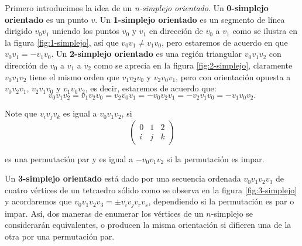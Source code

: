 \documentclass[12pt]{book}
\theoremstyle{definition}
\newcounter{in}
\begin{document}
Primero introducimos la idea de un \emph{n-simplejo orientado}. Un
\textbf{0-simplejo orientado} es un punto $v$. Un \textbf{1-simplejo
  orientado} es un segmento de línea dirigido $v_{0}v_{1}$ uniendo los
puntos $v_{0}$ y $v_{1}$ en dirección de $v_{0}$ a $v_{1}$ como se
ilustra en la figura \ref{fig:1-simplejo}, así que
$v_{0}v_{1}\neq v_{1}v_{0}$, pero estaremos de acuerdo en que~$v_{0}v_{1}=-v_{1}v_{0}$. Un \textbf{2-simplejo orientado} es una
región triangular $v_{0}v_{1}v_{2}$ con dirección de $v_{0}$ a $v_{1}$
a $v_{2}$ como se aprecia en la figura \ref{fig:2-simplejo}, claramente~$v_{0}v_{1}v_{2}$ tiene el mismo orden que
$v_{1}v_{2}v_{0}$ y $v_{2}v_{0}v_{1}$, pero con orientación opuesta a
$v_{0}v_{2}v_{1}$, $v_{2}v_{1}v_{0}$ y $v_{1}v_{0}v_{2}$, es decir, estaremos de acuerdo que:
$$v_{0}v_{1}v_{2}=v_{1}v_{2}v_{0}=v_{2}v_{0}v_{1}=-v_{0}v_{2}v_{1}=-v_{2}v_{1}v_{0}=-v_{1}v_{0}v_{2}.$$

Note que $v_{i}v_{j}v_{k}$ es igual a $v_{0}v_{1}v_{2}$, si
\[ \left(
  \begin{array}{ccc}
    0 & 1 & 2 \\
    i & j & k 
  \end{array} 
\right)\] 

es una permutación par y es igual a $-v_{0}v_{1}v_{2}$ si la
permutación es impar.

Un \textbf{3-simplejo orientado} está dado por una secuencia ordenada
$v_{0}v_{1}v_{2}v_{3}$ de cuatro vértices de un tetraedro sólido
como se observa en la figura \ref{fig:3-simplejo} y
acordaremos que $v_{0}v_{1}v_{2}v_{3}=\pm v_{i}v_{j}v_{r}v_{s}$,
dependiendo si la permutación es par o impar. Así, dos maneras
de enumerar los vértices de un $n$-simplejo se considerarán
equivalentes, o producen la misma orientación si difieren una de la otra
por una permutación par. 
\end{document}
